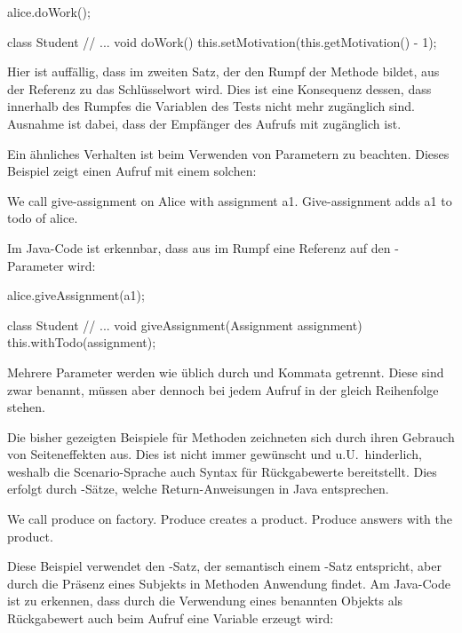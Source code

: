 \begin{jcodeblock}
    alice.doWork();

    class Student {
        // ...
        void doWork() {
            this.setMotivation(this.getMotivation() - 1);
        }
    }
\end{jcodeblock}

Hier ist auffällig, dass im zweiten Satz, der den Rumpf der Methode bildet,
aus der Referenz zu  das Schlüsselwort  wird.
Dies ist eine Konsequenz dessen, dass innerhalb des Rumpfes die Variablen des Tests nicht mehr zugänglich sind.
Ausnahme ist dabei, dass der Empfänger des Aufrufs mit  zugänglich ist.

Ein ähnliches Verhalten ist beim Verwenden von Parametern zu beachten.
Dieses Beispiel zeigt einen Aufruf mit einem solchen:

\begin{codeblock}
    We call give-assignment on Alice with assignment a1.
    Give-assignment adds a1 to todo of alice.
\end{codeblock}

Im Java-Code ist erkennbar, dass aus  im Rumpf eine Referenz auf den -Parameter wird:

\begin{jcodeblock}
    alice.giveAssignment(a1);

    class Student {
        // ...
        void giveAssignment(Assignment assignment) {
            this.withTodo(assignment);
        }
    }
\end{jcodeblock}

Mehrere Parameter werden wie üblich durch  und Kommata getrennt.
Diese sind zwar benannt, müssen aber dennoch bei jedem Aufruf in der gleich Reihenfolge stehen.

Die bisher gezeigten Beispiele für Methoden zeichneten sich durch ihren Gebrauch von Seiteneffekten aus.
Dies ist nicht immer gewünscht und u.U.\ hinderlich, weshalb die Scenario-Sprache auch Syntax für Rückgabewerte bereitstellt.
Dies erfolgt durch -Sätze, welche Return-Anweisungen in Java entsprechen.

\begin{codeblock}
    We call produce on factory.
    Produce creates a product.
    Produce answers with the product.
\end{codeblock}

Diese Beispiel verwendet den -Satz, der semantisch einem -Satz entspricht, aber durch die Präsenz eines Subjekts in Methoden Anwendung findet.
Am Java-Code ist zu erkennen, dass durch die Verwendung eines benannten Objekts als Rückgabewert auch beim Aufruf eine Variable erzeugt wird:

